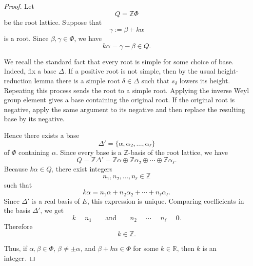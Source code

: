 \begin{proof}
    Let
    \[
        Q=\mathbb Z\Phi
    \]
    be the root lattice. Suppose that
    \[
        \gamma:=\beta+k\alpha
    \]
    is a root. Since \(\beta,\gamma\in\Phi\), we have
    \[
        k\alpha=\gamma-\beta\in Q.
    \]
    
    We recall the standard fact that every root is simple for some choice of base.
    Indeed, fix a base \(\Delta\). If a positive root is not simple, then by the usual
    height-reduction lemma there is a simple root \(\delta\in\Delta\) such that
    \(s_\delta\) lowers its height. Repeating this process sends the root to a
    simple root. Applying the inverse Weyl group element gives a base containing
    the original root. If the original root is negative, apply the same argument
    to its negative and then replace the resulting base by its negative.
    
    Hence there exists a base
    \[
        \Delta'=\{\alpha,\alpha_2,\ldots,\alpha_\ell\}
    \]
    of \(\Phi\) containing \(\alpha\). Since every base is a \(\mathbb Z\)-basis of the
    root lattice, we have
    \[
        Q=\mathbb Z\Delta'
        =
        \mathbb Z\alpha\oplus \mathbb Z\alpha_2\oplus\cdots\oplus
        \mathbb Z\alpha_\ell.
    \]
    Because \(k\alpha\in Q\), there exist integers
    \[
        n_1,n_2,\ldots,n_\ell\in\mathbb Z
    \]
    such that
    \[
        k\alpha
        =
        n_1\alpha+n_2\alpha_2+\cdots+n_\ell\alpha_\ell.
    \]
    Since \(\Delta'\) is a real basis of \(E\), this expression is unique. Comparing
    coefficients in the basis \(\Delta'\), we get
    \[
        k=n_1
        \qquad\text{and}\qquad
        n_2=\cdots=n_\ell=0.
    \]
    Therefore
    \[
        k\in\mathbb Z.
    \]
    
    Thus, if \(\alpha,\beta\in\Phi\), \(\beta\neq\pm\alpha\), and
    \(\beta+k\alpha\in\Phi\) for some \(k\in\mathbb R\), then \(k\) is an integer.
    \end{proof}